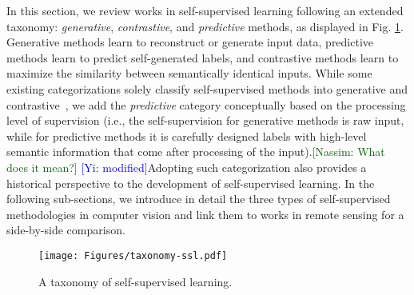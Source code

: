\documentclass[lettersize,journal]{IEEEtran}
\newcommand{\kibitz}[2]{\ifnum\Comments=1\textcolor{#1}{#2}\fi}
\newcommand{\nassim}[1]{\kibitz{darkgreen}      {[Nassim: #1]}}
\newcommand{\yi}[1]  {\kibitz{blue}   {[Yi: #1]}}
\begin{document}
In this section, we review works in self-supervised learning following an extended
taxonomy: \textit{generative}, \textit{contrastive}, and \textit{predictive} methods, as displayed in Fig. \ref{fig:taxonomy-ssl}. Generative methods learn to reconstruct or generate input data, predictive methods learn to predict self-generated labels, and contrastive methods learn to maximize the similarity between semantically identical inputs. While some existing categorizations solely classify self-supervised methods into generative and contrastive~\cite{jaiswal2021survey,liu2021self}, we add the \textit{predictive} category conceptually based on the processing level of supervision (i.e., the self-supervision for generative methods is raw input, while for predictive methods it is carefully designed labels with high-level semantic information that come after processing of the input).\nassim{What does it mean?} \yi{modified}Adopting such categorization also provides a historical perspective to the development of self-supervised learning. In the following sub-sections, we introduce in detail the three types of self-supervised methodologies in computer vision and link them to works in remote sensing for a side-by-side comparison.
\begin{figure}
\centering
\texttt{[image: Figures/taxonomy-ssl.pdf]}
\caption[taxonomy-ssl]{A taxonomy of self-supervised learning.}
\label{fig:taxonomy-ssl}
\end{figure}
\end{document}
